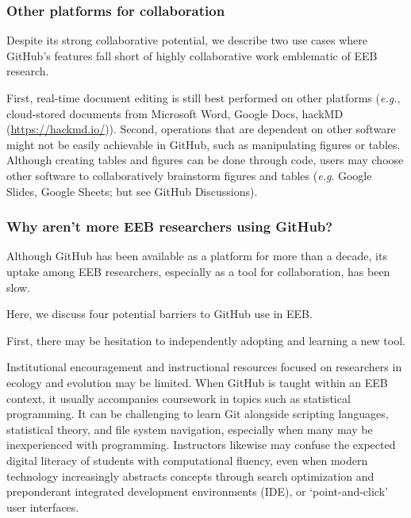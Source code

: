 \hypertarget{other-platforms-for-collaboration}{%
\subsubsection{Other platforms for collaboration}\label{other-platforms-for-collaboration}}

Despite its strong collaborative potential, we describe two use cases where GitHub's features fall short of highly collaborative work emblematic of EEB research.

First, real-time document editing is still best performed on other platforms (\emph{e.g.}, cloud-stored documents from Microsoft Word, Google Docs, hackMD (\url{https://hackmd.io/})).
Second, operations that are dependent on other software might not be easily achievable in GitHub, such as manipulating figures or tables.
Although creating tables and figures can be done through code, users may choose other software to collaboratively brainstorm figures and tables (\emph{e.g}. Google Slides, Google Sheets; but see GitHub Discussions).

\hypertarget{why-arent-more-eeb-researchers-using-github}{%
\subsubsection{Why aren't more EEB researchers using GitHub?}\label{why-arent-more-eeb-researchers-using-github}}

Although GitHub has been available as a platform for more than a decade, its uptake among EEB researchers, especially as a tool for collaboration, has been slow.

Here, we discuss four potential barriers to GitHub use in EEB.

First, there may be hesitation to independently adopting and learning a new tool.

Institutional encouragement and instructional resources focused on researchers in ecology and evolution may be limited.
When GitHub is taught within an EEB context, it usually accompanies coursework in topics such as statistical programming.
It can be challenging to learn Git alongside scripting languages, statistical theory, and file system navigation, especially when many may be inexperienced with programming.
Instructors likewise may confuse the expected digital literacy of students with computational fluency, even when modern technology increasingly abstracts concepts through search optimization and preponderant integrated development environments (IDE), or `point-and-click' user interfaces.

